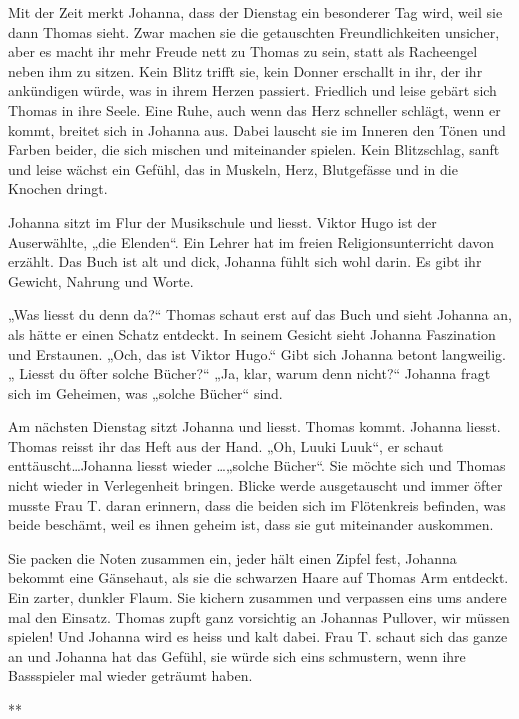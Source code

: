 \documentclass[10pt,titlepage,a5paper]{book}
\newcommand{\sterne}{\par{\centering ***\par}}
\begin{document}
Mit der Zeit merkt Johanna, dass der Dienstag ein besonderer Tag wird, weil sie dann Thomas sieht. Zwar machen sie die getauschten Freundlichkeiten unsicher, aber es macht ihr mehr Freude nett zu Thomas zu sein, statt als Racheengel neben ihm zu sitzen. Kein Blitz trifft sie, kein Donner erschallt in ihr, der ihr ankündigen wür\-de, was in ihrem Herzen passiert. Friedlich und leise gebärt sich Thomas in ihre Seele. Eine Ruhe, auch wenn das Herz schneller schlägt, wenn er kommt, breitet sich in Johanna aus. Dabei lauscht sie im Inneren den Tönen und Farben beider, die sich mischen und miteinander spielen. Kein Blitzschlag, sanft und leise wächst ein Gefühl, das in Muskeln, Herz, Blutgefässe und in die Knochen dringt.

Johanna sitzt im Flur der Musikschule und liesst. Viktor Hugo ist der Auserwählte, „die Elenden“. Ein Lehrer hat im freien Religionsunterricht davon erzählt. Das Buch ist alt und dick, Johanna fühlt sich wohl darin. Es gibt ihr Gewicht, Nahrung und Worte.

 „Was liesst du denn da?“ Thomas schaut erst auf das Buch und sieht Johanna an, als hätte er einen Schatz entdeckt. In seinem Gesicht sieht Johanna Faszination und Erstaunen. „Och, das ist Viktor Hugo.“ Gibt sich Johanna betont langweilig. „ Liesst du öfter solche Bücher?“  „Ja, klar, warum denn nicht?“ Johanna fragt sich im Geheimen, was „solche Bücher“ sind. 
 
Am nächsten Dienstag sitzt Johanna und liesst. Thomas kommt. Johanna liesst. Thomas reisst ihr das Heft aus der Hand. „Oh, Luuki Luuk“, er schaut enttäuscht\dots  Johanna liesst wieder \dots „solche Bücher“. Sie möchte sich und Thomas nicht wieder in Verlegenheit bringen. 
Blicke werde ausgetauscht und immer öfter musste Frau T. daran erinnern, dass die beiden sich im Flötenkreis befinden, was beide beschämt, weil es ihnen geheim ist, dass sie gut miteinander auskommen.

Sie packen die Noten zusammen ein, jeder hält einen Zipfel fest, Johanna bekommt eine Gänsehaut, als sie die schwarzen Haare auf Thomas Arm entdeckt. Ein zarter, dunkler Flaum. Sie kichern zusammen und verpassen eins ums andere mal den Einsatz. Thomas zupft ganz vorsichtig an Johannas Pullover, wir müssen spielen! Und Johanna wird es heiss und kalt dabei. Frau T. schaut sich das ganze an und Johanna hat das Gefühl, sie würde sich eins schmustern, wenn ihre Bassspieler mal wieder geträumt haben. 


\sterne
\end{document}
